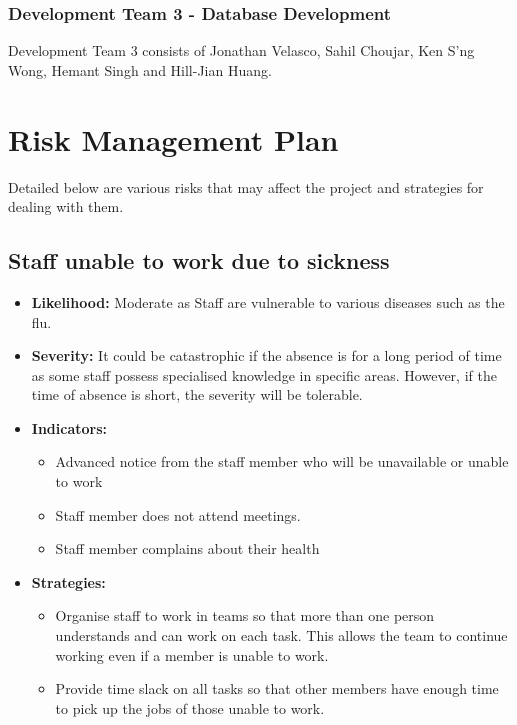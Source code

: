 \documentclass{article}
\begin{document}
\subsubsection*{Development Team 3 - Database Development}
Development Team 3 consists of Jonathan Velasco, Sahil Choujar, Ken S'ng Wong, Hemant Singh and Hill-Jian Huang.
\\

\newpage

\section{Risk Management Plan}

Detailed below are various risks that may affect the project and strategies for dealing with them.

\subsection{Staff unable to work due to sickness}
\begin{itemize}
	\item \textbf{Likelihood:} Moderate as Staff are vulnerable to various diseases such as the flu.
	\item \textbf{Severity:} It could be catastrophic if the absence is for a long period of time as some staff possess specialised knowledge in specific areas. However, if the time of absence is short, the severity will be tolerable.
	\item \textbf{Indicators:}
		\begin{itemize}
			\item Advanced notice from the staff member who will be unavailable or unable to work 
			\item Staff member does not attend meetings.
			\item Staff member complains about their health
		\end{itemize}
	\item \textbf{Strategies:} 
		\begin{itemize}
			\item Organise staff to work in teams so that more than one person understands and can work on each task. This allows the team to continue working even if a member is unable to work.
			\item Provide time slack on all tasks so that other members have enough time to pick up the jobs of those unable to work.
		\end{itemize}
\end{itemize}
\end{document}
